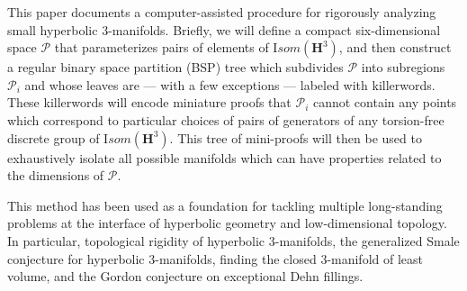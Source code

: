 This paper documents a computer-assisted procedure
for rigorously analyzing small hyperbolic $3$-manifolds.
Briefly, we will define a compact six-dimensional space ${\mathcal P}$
that parameterizes pairs of elements of ${\mathrm Isom}({\mathbf H}^3)$,
and then construct a regular binary space partition (BSP) tree
which subdivides ${\mathcal P}$ into subregions ${\mathcal P_i}$
and whose leaves are --- with a few exceptions --- labeled with killerwords.
These killerwords will encode miniature proofs that ${\mathcal P_i}$
cannot contain any points which correspond to
particular choices of pairs of generators of
any torsion-free discrete group of ${\mathrm Isom}({\mathbf H}^3)$.
This tree of mini-proofs will then be used
to exhaustively isolate all possible manifolds
which can have properties related to the dimensions of ${\mathcal P}$.

This method has been used as a foundation for tackling multiple long-standing
problems at the interface of hyperbolic geometry and low-dimensional topology.
In particular,
	topological rigidity of hyperbolic $3$-manifolds,
	the generalized Smale conjecture for hyperbolic $3$-manifolds,
	finding the closed $3$-manifold of least volume,
	and the Gordon conjecture on exceptional Dehn fillings.
